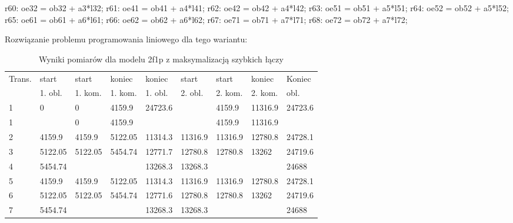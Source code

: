 \documentclass[a4paper,11pt, titlepage]{article}
\begin{document}
\begin{flushleft}
r60: oe32 = ob32 + a3*l32;\linebreak
r61: oe41 = ob41 + a4*l41;\linebreak
r62: oe42 = ob42 + a4*l42;\linebreak
r63: oe51 = ob51 + a5*l51;\linebreak
r64: oe52 = ob52 + a5*l52;\linebreak
r65: oe61 = ob61 + a6*l61;\linebreak
r66: oe62 = ob62 + a6*l62;\linebreak
r67: oe71 = ob71 + a7*l71;\linebreak
r68: oe72 = ob72 + a7*l72;\linebreak
\end{flushleft}

Rozwiązanie problemu programowania liniowego dla tego wariantu:
\begin{table}[hp!]
\begin{tabular}{|l|l|l|l|l|l|l|l|l|}\hline
Trans.	&start &start &koniec &koniec &start &start	&koniec	&Koniec\\
&1. obl. &1. kom. &1. kom. &1. obl. &2. obl. &2. kom.	&2.	kom. &obl.\\ \hline
1	&0			&0			&4159.9		&24723.6	&			&4159.9		&11316.9	&24723.6\\ \hline
1	&			&0			&4159.9		&			&			&4159.9		&11316.9	&\\ \hline
2	&4159.9		&4159.9		&5122.05	&11314.3	&11316.9	&11316.9	&12780.8	&24728.1\\ \hline
3	&5122.05	&5122.05	&5454.74	&12771.7	&12780.8	&12780.8	&13262		&24719.6\\ \hline
4	&5454.74	&			&			&13268.3	&13268.3	&			&			&24688\\ \hline
5	&4159.9		&4159.9		&5122.05	&11314.3	&11316.9	&11316.9	&12780.8	&24728.1\\ \hline
6	&5122.05	&5122.05	&5454.74	&12771.6	&12780.8	&12780.8	&13262		&24719.6\\ \hline
7	&5454.74	&			&			&13268.3	&13268.3	&			&			&24688\\ \hline

\end{tabular}
\caption{Wyniki pomiarów dla modelu 2f1p z maksymalizacją szybkich łączy \label{2f1p_lt}}
\end{table}
\end{document}
